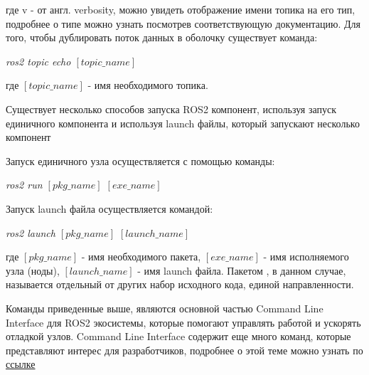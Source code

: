 \documentclass[a4paper, 14pt]{extreport}
\begin{document}
 где v - от англ. verbosity, можно увидеть отображение имени топика на его тип, подробнее о типе можно узнать посмотрев соответствующую
 документацию. Для того, чтобы дублировать поток данных в оболочку существует команда:
\begin{center}
        \par \textsl{ros2 topic echo $\left[topic\_name\right]$}
\end{center}
\par\noindent где \(\left[topic\_name\right]\) - имя необходимого топика.
\par\noindent Существует несколько способов запуска ROS2 компонент, используя запуск единичного компонента и используя launch файлы,
 который запускают несколько компонент
\par\noindent Запуск единичного узла осуществляется с помощью команды:
\begin{center}
        \par \textsl{ros2 run $\left[pkg\_name\right]$ $\left[exe\_name\right]$}
\end{center}
\par\noindent Запуск launch файла осуществляется командой:
\begin{center}
        \par \textsl{ros2 launch $\left[pkg\_name\right]$ $\left[launch\_name\right]$}
\end{center}
\par\noindent где \(\left[pkg\_name\right]\) - имя необходимого пакета, \(\left[exe\_name\right]\) - имя исполняемого узла (ноды),
 \(\left[launch\_name\right]\) - имя launch файла. Пакетом , в данном случае, называется отдельный от других набор исходного кода,
 единой направленности.
\par\noindent Команды приведенные выше, являются основной частью Command Line Interface для ROS2 экосистемы, которые помогают 
 управлять работой и ускорять отладкой узлов. Command Line Interface содержит еще много команд, которые представляют интерес
 для разработчиков, подробнее о этой теме можно узнать по \href{https://docs.ros.org/en/humble/Tutorials/Beginner-CLI-Tools.html}{ссылке}
\end{document}

